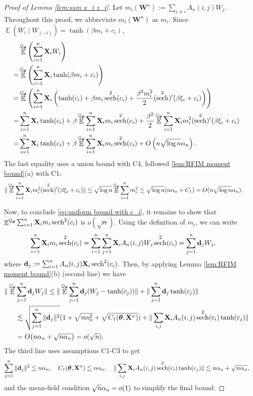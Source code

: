 \documentclass[preprint,reqno]{imsart}
\newcommand{\ttheta}{\boldsymbol{\theta}}
\newcommand{\an}{\alpha_{\mathnormal n}}
\DeclareMathOperator{\sech}{sech}
\DeclareMathOperator{\EE}{\mathbb{E}}
\DeclareMathOperator{\QQ}{\mathbb{Q}}
\newcommand{\W}{\mathbf{W}}
\newcommand{\X}{\mathbf{X}}
\DeclareMathOperator{\sumin}{\sum_{\mathnormal i=1}^{\mathnormal n}}
\begin{document}
\begin{proof}[Proof of Lemma \ref{lem:sum x_i z_i}]
    Let $m_i(\W^n) := \sum_{j \neq i} A_n(i,j) W_j$. Throughout this proof, we abbreviate $m_i(\W^n)$ as $m_i$. Since $\EE(W_i \mid {W_{(-i)}}) = \tanh(\beta m_i + c_i)$,
    \begin{align}
        &\EE^{\QQ_{\ttheta}} \left(\sumin \X_i W_i \right) \notag \\
        =& \EE^{\QQ_{\ttheta}} \left(\sumin \X_i \tanh(\beta m_i + c_i) \right) \notag \\
        =& \EE^{\QQ_{\ttheta}} \left(\sumin \X_i \left(\tanh(c_i) + \beta m_i \sech^2(c_i) + \frac{\beta^2 m_i^2}{2} (\sech^2)'(\beta \xi_i + c_i) \right) \right) \notag \\
        =& \sumin \X_i \tanh(c_i) + \beta \EE^{\QQ_{\ttheta}} \sumin \X_i m_i \sech^2(c_i) + \frac{\beta^2}{2} \EE^{\QQ_{\ttheta}} \sumin \X_i m_i^2 (\sech^2)'(\beta \xi_i + c_i) \label{eq:linear term high tmp} \\
        =& \sumin \X_i \tanh(c_i) + \beta \EE^{\QQ_{\ttheta}} \sumin \X_i m_i \sech^2(c_i) + O\left(n\sqrt{\log n} \an \right). \notag%
    \end{align}
    The last equality uses a union bound with C4, followed \cref{lem:RFIM moment bound}(a) with C1:
    \begin{align*}
        \|\EE^{\QQ_{\ttheta}} \sumin \X_i m_i^2 (\sech^2)'(\beta \xi_i + c_i)\| &\lesssim \sqrt{\log n} \EE^{\QQ_{\ttheta}} \sumin m_i^2 
        \lesssim \sqrt{\log n} (n \an + C_1) = O(n \sqrt{\log n} \an).
    \end{align*}
    
    Now, to conclude \eqref{eq:uniform bound with c_i}, it remains to show that $\EE^{\QQ_{\ttheta}} \sumin \X_{i} m_i \sech^2(c_i)$ 
    is $o(\sqrt{n})$.
    Using the definition of $m_i$, we can write
    \begin{align*}
        \sumin \X_{i} m_i \sech^2(c_i) &= \sumin \sum_{j=1}^n \X_{i} A_n(i,j) W_j \sech^2(c_i) = \sum_{j=1}^n \mathbf{d}_j W_j,
    \end{align*}
    where $\mathbf{d}_j:= \sumin A_n(i,j) \X_{i} \sech^2(c_i).$ 
    Then, by applying Lemma \ref{lem:RFIM moment bound}(b) (second line) we have
    \begin{align*}
        \|\EE^{\QQ_{\ttheta}} &\sum_{j=1}^n \mathbf{d}_j W_j\| \le \|\EE^{\QQ_{\ttheta}} \sum_{j=1}^n \mathbf{d}_j (W_j - \tanh(c_j))\| + %
        \|\sum_{j=1}^n \mathbf{d}_j \tanh(c_j)\| \\
        &\lesssim \sqrt{\sum_{j=1}^n \|\mathbf{d}_j\|^2} (1 + \sqrt{n \alpha_n^2} + \sqrt{C_1(\ttheta, \X^n)}) + \|\sum_{i,j} \X_{i} A_n(i,j) \sech^2(c_i) \tanh(c_j)\| \\
        &= O\big(n\an + \sqrt{n\an}\big) = o(\sqrt{n}).
    \end{align*}
    The third line uses assumptions C1-C3 to get $$\sum_{j=1}^n \|\mathbf{d}_j\|^2 \lesssim n\an, \quad C_1(\ttheta, \X^n) \lesssim n\an, \quad \|\sum_{i,j} \X_{i} A_n(i,j) \sech^2(c_i) \tanh(c_j)\| \lesssim n\an +\sqrt{n\an},$$
    and the mean-field condition $\sqrt{n}\an = o(1)$ to simplify the final bound.


\end{proof}
\end{document}
